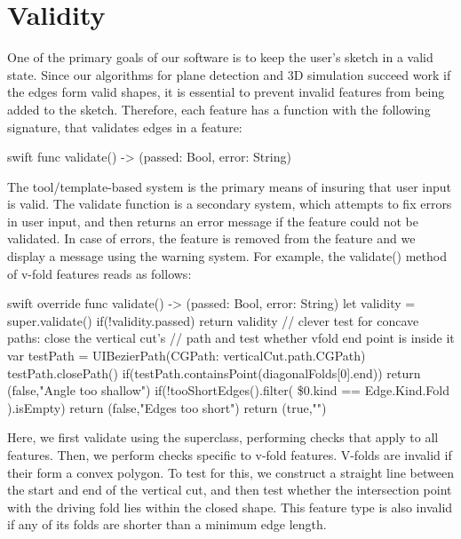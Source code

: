\section{Validity}\label{validity}

One of the primary goals of our software is to keep the user's sketch in
a valid state. Since our algorithms for plane detection and 3D
simulation succeed work if the edges form valid shapes, it is essential
to prevent invalid features from being added to the sketch. Therefore,
each feature has a function with the following signature, that validates
edges in a feature:

\begin{pygmented}{swift}
func validate() -> (passed: Bool, error: String) 
\end{pygmented}

The tool/template-based system is the primary means of insuring that
user input is valid. The validate function is a secondary system, which
attempts to fix errors in user input, and then returns an error message
if the feature could not be validated. In case of errors, the feature is
removed from the feature and we display a message using the warning
system. For example, the validate() method of v-fold features reads as
follows:

\singlespacing 

\begin{pygmented}{swift}
override func validate() -> (passed: Bool, error: String) {
 let validity = super.validate()    
 if(!validity.passed){
    return validity
 }
 // clever test for concave paths: close the vertical cut's
 // path and test whether vfold end point is inside it
 var testPath = UIBezierPath(CGPath: verticalCut.path.CGPath)
 testPath.closePath()
 if(testPath.containsPoint(diagonalFolds[0].end)){
    return (false,"Angle too shallow")
 }
 if(!tooShortEdges().filter({
    \$0.kind == Edge.Kind.Fold
    }).isEmpty){
        return (false,"Edges too short")
 }
    return (true,"")
 }
\end{pygmented}

\doublespacing

Here, we first validate using the superclass, performing checks that
apply to all features. Then, we perform checks specific to v-fold
features. V-folds are invalid if their form a convex polygon. To test
for this, we construct a straight line between the start and end of the
vertical cut, and then test whether the intersection point with the
driving fold lies within the closed shape. This feature type is also
invalid if any of its folds are shorter than a minimum edge length.


